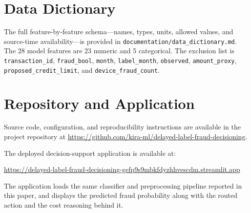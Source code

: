\documentclass[conference]{IEEEtran}
\begin{document}
\appendices

\section{Data Dictionary}

The full feature-by-feature schema---names, types, units, allowed values,
and source-time availability---is provided in
\texttt{documentation/data\_dictionary.md}. The 28 model features are 23
numeric and 5 categorical. The exclusion list is
\texttt{transaction\_id}, \texttt{fraud\_bool}, \texttt{month},
\texttt{label\_month}, \texttt{observed}, \texttt{amount\_proxy},
\texttt{proposed\_credit\_limit}, and \texttt{device\_fraud\_count}.

\section{Repository and Application}

Source code, configuration, and reproducibility instructions are available
in the project repository at
\url{https://github.com/kira-ml/delayed-label-fraud-decisioning}.

The deployed decision-support application is available at:

\url{https://delayed-label-fraud-decisioning-gefp9s9mbkfdyzhhvescdm.streamlit.app}

The application loads the same classifier and preprocessing pipeline
reported in this paper, and displays the predicted fraud probability along
with the routed action and the cost reasoning behind it.
\end{document}

